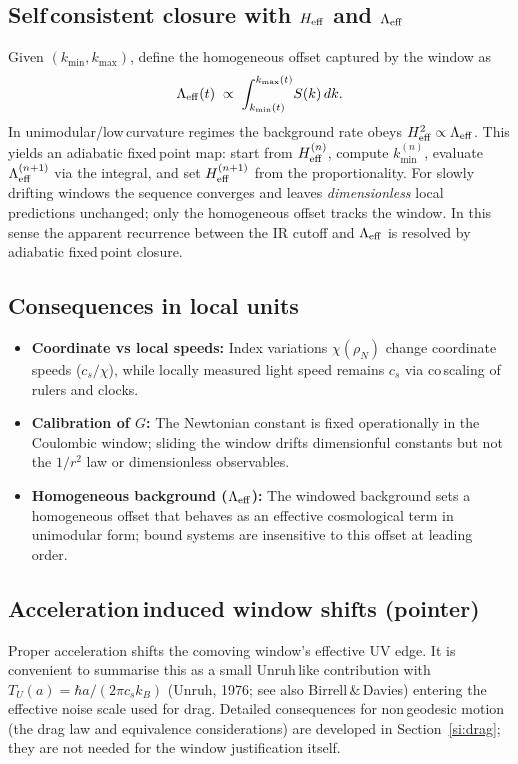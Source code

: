 \documentclass[11pt]{article}
\begin{document}
\subsection*{Self\,consistent closure with $H_{\rm eff}$ and $\Lambda_{\rm eff}$}
Given $(k_{\min},k_{\max})$, define the homogeneous offset captured by the window as
\begin{equation}
  \Lambda_{\rm eff}(t) \;\propto\; \int_{k_{\min}(t)}^{k_{\max}(t)}\! S(k)\,dk.
\end{equation}
In unimodular/low\,curvature regimes the background rate obeys $H_{\rm eff}^2 \propto \Lambda_{\rm eff}$. This yields an adiabatic fixed\,point map: start from $H_{\rm eff}^{(n)}$, compute $k_{\min}^{(n)}$, evaluate $\Lambda_{\rm eff}^{(n+1)}$ via the integral, and set $H_{\rm eff}^{(n+1)}$ from the proportionality. For slowly drifting windows the sequence converges and leaves \emph{dimensionless} local predictions unchanged; only the homogeneous offset tracks the window. In this sense the apparent recurrence between the IR cutoff and $\Lambda_{\rm eff}$ is resolved by adiabatic fixed\,point closure.

\subsection*{Consequences in local units}
\begin{itemize}[leftmargin=*]
  \item \textbf{Coordinate vs local speeds:} Index variations $\chi(\rho_N)$ change coordinate speeds ($c_s/\chi$), while locally measured light speed remains $c_s$ via co\,scaling of rulers and clocks.
  \item \textbf{Calibration of $G$:} The Newtonian constant is fixed operationally in the Coulombic window; sliding the window drifts dimensionful constants but not the $1/r^2$ law or dimensionless observables.
  \item \textbf{Homogeneous background ($\Lambda_{\rm eff}$):} The windowed background sets a homogeneous offset that behaves as an effective cosmological term in unimodular form; bound systems are insensitive to this offset at leading order.
\end{itemize}

\subsection*{Acceleration\,induced window shifts (pointer)}
Proper acceleration shifts the comoving window's effective UV edge. It is convenient to summarise this as a small Unruh\,like contribution with $T_U(a)=\hbar a/(2\pi c_s k_B)$ (Unruh, 1976; see also Birrell\,\&\,Davies) entering the effective noise scale used for drag. Detailed consequences for non\,geodesic motion (the drag law and equivalence considerations) are developed in Section~\ref{si:drag}; they are not needed for the window justification itself.
\end{document}
